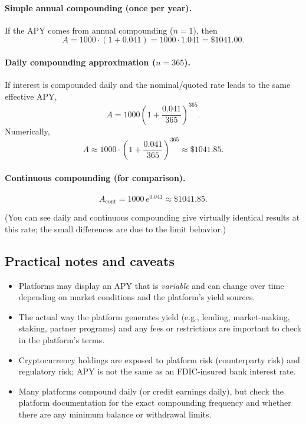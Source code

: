 \documentclass{article}
\begin{document}
\paragraph{Simple annual compounding (once per year).}
If the APY comes from annual compounding (\(n=1\)), then
\[
A = 1000\cdot(1+0.041)=1000\cdot 1.041 = \$1041.00.
\]

\paragraph{Daily compounding approximation (\(n=365\)).}
If interest is compounded daily and the nominal/quoted rate leads to the same effective APY,
\[
A = 1000\left(1+\frac{0.041}{365}\right)^{365}.
\]
Numerically,
\[
A \approx 1000\cdot\left(1+\frac{0.041}{365}\right)^{365} \approx \$1041.85.
\]

\paragraph{Continuous compounding (for comparison).}
\[
A_{\text{cont}} = 1000\,e^{0.041}\approx \$1041.85.
\]

(You can see daily and continuous compounding give virtually identical results at this rate; the small differences are due to the limit behavior.)

\bigskip

\subsection*{Practical notes and caveats}
\begin{itemize}
  \item Platforms may display an APY that is \emph{variable} and can change over time depending on market conditions and the platform's yield sources.
  \item The actual way the platform generates yield (e.g., lending, market-making, staking, partner programs) and any fees or restrictions are important to check in the platform's terms.
  \item Cryptocurrency holdings are exposed to platform risk (counterparty risk) and regulatory risk; APY is not the same as an FDIC-insured bank interest rate.
  \item Many platforms compound daily (or credit earnings daily), but check the platform documentation for the exact compounding frequency and whether there are any minimum balance or withdrawal limits.
\end{itemize}
\end{document}
